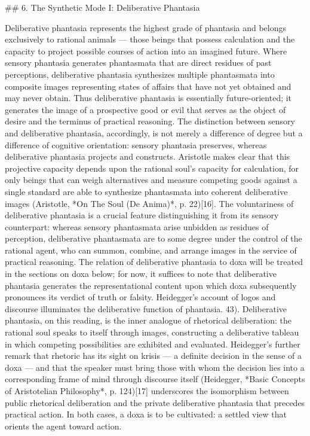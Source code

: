 ## 6. The Synthetic Mode I: Deliberative Phantasia

Deliberative phantasia represents the highest grade of phantasia and belongs exclusively to rational animals — those beings that possess calculation and the capacity to project possible courses of action into an imagined future. Where sensory phantasia generates phantasmata that are direct residues of past perceptions, deliberative phantasia synthesizes multiple phantasmata into composite images representing states of affairs that have not yet obtained and may never obtain. Thus deliberative phantasia is essentially future-oriented; it generates the image of a prospective good or evil that serves as the object of desire and the terminus of practical reasoning. The distinction between sensory and deliberative phantasia, accordingly, is not merely a difference of degree but a difference of cognitive orientation: sensory phantasia preserves, whereas deliberative phantasia projects and constructs. Aristotle makes clear that this projective capacity depends upon the rational soul's capacity for calculation, for only beings that can weigh alternatives and measure competing goods against a single standard are able to synthesize phantasmata into coherent deliberative images (Aristotle, *On The Soul (De Anima)*, p. 22)[16]. The voluntariness of deliberative phantasia is a crucial feature distinguishing it from its sensory counterpart: whereas sensory phantasmata arise unbidden as residues of perception, deliberative phantasmata are to some degree under the control of the rational agent, who can summon, combine, and arrange images in the service of practical reasoning. The relation of deliberative phantasia to doxa will be treated in the sections on doxa below; for now, it suffices to note that deliberative phantasia generates the representational content upon which doxa subsequently pronounces its verdict of truth or falsity. Heidegger's account of logos and discourse illuminates the deliberative function of phantasia. 43). Deliberative phantasia, on this reading, is the inner analogue of rhetorical deliberation: the rational soul speaks to itself through images, constructing a deliberative tableau in which competing possibilities are exhibited and evaluated. Heidegger's further remark that rhetoric has its sight on krisis — a definite decision in the sense of a doxa — and that the speaker must bring those with whom the decision lies into a corresponding frame of mind through discourse itself (Heidegger, *Basic Concepts of Aristotelian Philosophy*, p. 124)[17] underscores the isomorphism between public rhetorical deliberation and the private deliberative phantasia that precedes practical action. In both cases, a doxa is to be cultivated: a settled view that orients the agent toward action. 

